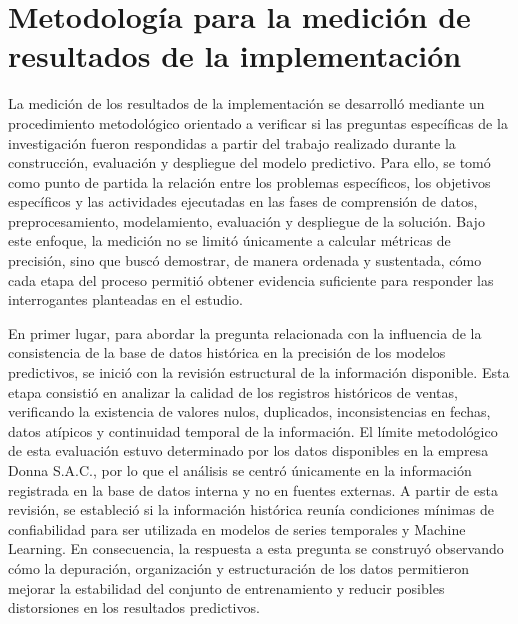 

		


\section{Metodología para la medición de resultados de la implementación}

La medición de los resultados de la implementación se desarrolló mediante un procedimiento metodológico orientado
a verificar si las preguntas específicas de la investigación fueron respondidas a partir del trabajo realizado 
durante la construcción, evaluación y despliegue del modelo predictivo. Para ello, se tomó como punto de partida
la relación entre los problemas específicos, los objetivos específicos y las actividades ejecutadas en las fases 
de comprensión de datos, preprocesamiento, modelamiento, evaluación y despliegue de la solución. Bajo este 
enfoque, la medición no se limitó únicamente a calcular métricas de precisión, sino que buscó demostrar, de 
manera ordenada y sustentada, cómo cada etapa del proceso permitió obtener evidencia suficiente para responder 
las interrogantes planteadas en el estudio.

En primer lugar, para abordar la pregunta relacionada con la influencia de la consistencia de la base de datos 
histórica en la precisión de los modelos predictivos, se inició con la revisión estructural de la información 
disponible. Esta etapa consistió en analizar la calidad de los registros históricos de ventas, verificando la 
existencia de valores nulos, duplicados, inconsistencias en fechas, datos atípicos y continuidad temporal de 
la información. El límite metodológico de esta evaluación estuvo determinado por los datos disponibles en la 
empresa Donna S.A.C., por lo que el análisis se centró únicamente en la información registrada en la base de 
datos interna y no en fuentes externas. A partir de esta revisión, se estableció si la información histórica 
reunía condiciones mínimas de confiabilidad para ser utilizada en modelos de series temporales y Machine Learning.
En consecuencia, la respuesta a esta pregunta se construyó observando cómo la depuración, organización y 
estructuración de los datos permitieron mejorar la estabilidad del conjunto de entrenamiento y reducir posibles
distorsiones en los resultados predictivos.

